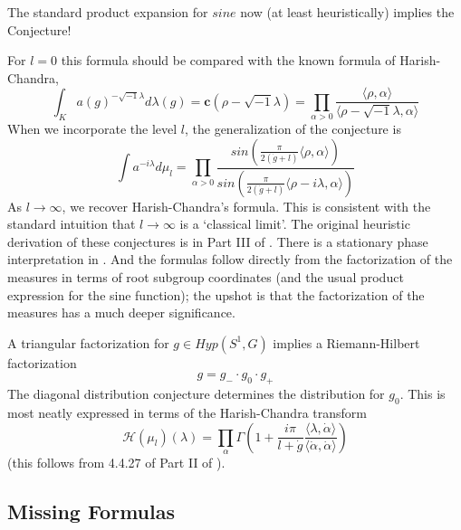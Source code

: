 \documentclass{amsart}
\theoremstyle{conjecture}
\theoremstyle{definition}
\theoremstyle{question}
\theoremstyle{questions}
\theoremstyle{remark}
\theoremstyle{remarks}
\theoremstyle{example}
\numberwithin{equation}{section}
\begin{document}
The standard product expansion for $sine$ now (at least heuristically) implies the Conjecture!


For $l=0$ this formula should be
compared with the known formula of Harish-Chandra,
$$\int_K a(g)^{-\sqrt{-1}\lambda}d\lambda(g)=
\mathbf c(\rho -\sqrt{-1}\lambda )=\prod_{\alpha >0}\frac {\langle\rho ,\alpha
\rangle}{\langle\rho -\sqrt{-1}\lambda ,\alpha\rangle}$$
When we incorporate the level $l$, the generalization of the conjecture is
$$\int a^{-i\lambda}d\mu_{l}=\prod_{
\alpha >0}\frac {sin(\frac {\pi}{2(\dot {g}+l)}\langle\rho ,\alpha
\rangle )}{sin(\frac {\pi}{2(\dot {g}+l)}\langle\rho -i\lambda ,\alpha
\rangle )}$$
As $l\to\infty$, we recover Harish-Chandra's formula. This is consistent with the standard
intuition that $l\to\infty$ is a `classical limit'. The original heuristic derivation of these conjectures
is in Part III of \cite{Pi1}. There is a stationary phase interpretation in \cite{Pi2}. And the
formulas follow directly from the factorization of the measures in terms of root subgroup coordinates (and the usual product expression for the sine function); the upshot is that the factorization of the measures has a much deeper significance.

A triangular factorization for $g\in Hyp(S^1,G)$ implies a Riemann-Hilbert factorization
$$g=g_{-}\cdot g_0\cdot g_{+}$$
The diagonal distribution conjecture determines the distribution
for $g_0$. This is most neatly expressed in terms of the Harish-Chandra
transform
$$\mathcal H(\mu_l)(\lambda)=\prod_{\alpha}\Gamma(1+\frac{i\pi}{l+\dot g}\frac{\langle\lambda,\dot\alpha\rangle}{\langle\dot\alpha,\dot\alpha\rangle})$$
(this follows from 4.4.27 of Part II of \cite{Pi1}).



\subsection{ Missing Formulas}\label{missingformulas}
\end{document}
